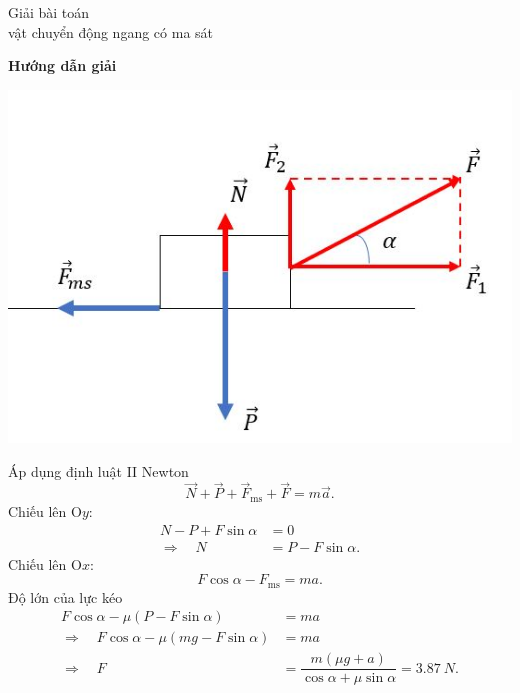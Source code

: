 \begin{dang}{Giải bài toán\\ vật chuyển động ngang có ma sát}
	{	\begin{center}
			\textbf{Hướng dẫn giải}
		\end{center}
		\begin{center}
			\includegraphics[scale=0.6]{../figs/VN10-PH-15-A-005-3-V2-02.JPG}
		\end{center} 
		 Áp dụng định luật II Newton 
			\begin{equation*}
				\vec{N}+\vec{P} + \vec{F}_{\text{ms}} + \vec{F} = m\vec{a}.
			\end{equation*}
		Chiếu lên O$y$:
			\begin{align*}
				N - P + F\sin \alpha  &= 0\\
				 \Rightarrow\quad N&=P - F\sin \alpha.	
			\end{align*}
		Chiếu lên O$x$:
			\begin{equation*}
				F\cos \alpha - F_{\text{ms}} = ma.
			\end{equation*}
		Độ lớn của lực kéo
			\begin{align*}
				F\cos \alpha - \mu(P - F\sin \alpha) &= ma\\
				\Rightarrow\quad F \cos \alpha - \mu (mg-F\sin \alpha) &= ma\\
				\Rightarrow\quad  F &=\dfrac{m(\mu g +a)}{\cos \alpha + \mu \sin \alpha}= \SI{3,87}{N}.
			\end{align*}
	}
\end{dang}
